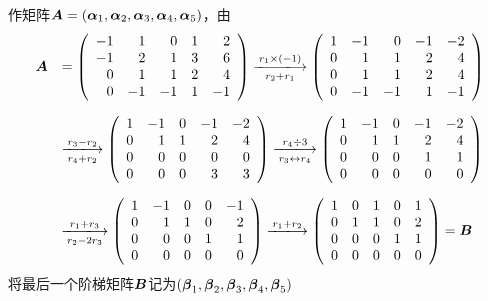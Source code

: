 \begin{frame}[allowframebreaks]
\begin{jie}
作矩阵$\boldsymbol{A}=(\boldsymbol{\alpha}_1,\boldsymbol{\alpha}_2,\boldsymbol{\alpha}_3,\boldsymbol{\alpha}_4,\boldsymbol{\alpha}_5)$，由
$$
\begin{array}{rl}
  \A &= \left(
       \begin{array}{rrrrr}
         -1&1&0&1&2\\
         -1&2&1&3&6\\
         0&1&1&2&4\\
         0&-1&-1&1&-1
       \end{array}
                    \right) \xlongrightarrow[r_2+r_1]{ r_1\times(-1)}
                    \left(
                    \begin{array}{rrrrr}
                      1&-1&0&-1&-2\\
                      0&1&1&2&4\\
                      0&1&1&2&4\\
                      0&-1&-1&1&-1
                    \end{array}
                                 \right)\\[0.4in]
     &\xlongrightarrow[r_4+r_2]{r_3- r_2}
       \left(
       \begin{array}{rrrrr}
         1&-1&0&-1&-2\\
         0&1&1&2&4\\
         0&0&0&0&0\\
         0&0&0&3&3
       \end{array}
                  \right) \xlongrightarrow[r_3\leftrightarrow r_4]{r_4\div 3}
                  \left(
                  \begin{array}{rrrrr}
                    1&-1&0&-1&-2\\
                    0&1&1&2&4\\
                    0&0&0&1&1\\
                    0&0&0&0&0
                  \end{array}
                             \right)
\end{array}
$$

$$
\begin{array}{rl}
  & \xlongrightarrow[r_2 -2 r_3]{r_1+r_3}
    \left(
    \begin{array}{rrrrr}
      1&-1&0&0&-1\\
      0&1&1&0&2\\
      0&0&0&1&1\\
      0&0&0&0&0
    \end{array}
               \right) \xlongrightarrow[]{r_1+r_2}
               \left(
               \begin{array}{rrrrr}
                 1&0&1&0&1\\
                 0&1&1&0&2\\
                 0&0&0&1&1\\
                 0&0&0&0&0
               \end{array}
                          \right) = \B
\end{array}
$$
将最后一个阶梯矩阵$\boldsymbol{B}$记为$(\boldsymbol{\beta}_1,\boldsymbol{\beta}_2,\boldsymbol{\beta}_3,\boldsymbol{\beta}_4,\boldsymbol{\beta}_5)$


\end{jie}
\end{frame}
